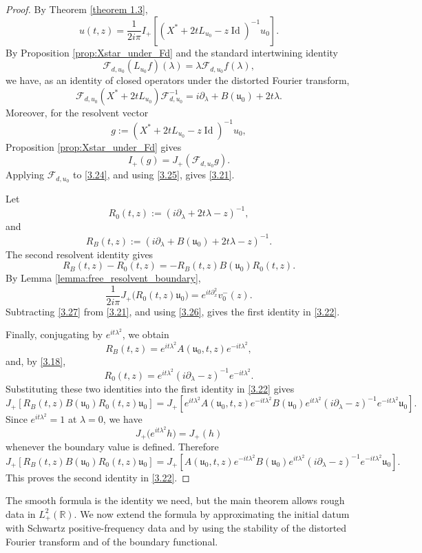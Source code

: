 \documentclass[10pt]{article}
\numberwithin{equation}{section}
\numberwithin{theorem}{section}
\begin{document}
\begin{proof}
By Theorem \ref{theorem 1.3},
\begin{equation}
\label{3.24}
u(t,z)
=
\frac1{2i\pi}
I_+\left[
(X^*+2tL_{u_0}-z\operatorname{Id})^{-1}u_0
\right].
\end{equation}
By Proposition \ref{prop:Xstar_under_Fd} and the standard intertwining identity
\[
\mathcal F_{d,u_0}(L_{u_0}f)(\lambda)
=
\lambda\mathcal F_{d,u_0}f(\lambda),
\]
we have, as an identity of closed operators under the distorted Fourier transform,
\begin{equation}
\label{3.25}
\mathcal F_{d,u_0}
(X^*+2tL_{u_0})
\mathcal F_{d,u_0}^{-1}
=
i\partial_\lambda+B(\mathfrak u_0)+2t\lambda .
\end{equation}
Moreover, for the resolvent vector
\[
g:=(X^*+2tL_{u_0}-z\operatorname{Id})^{-1}u_0,
\]
Proposition \ref{prop:Xstar_under_Fd} gives
\[
I_+(g)=J_+(\mathcal F_{d,u_0}g).
\]
Applying \(\mathcal F_{d,u_0}\) to \eqref{3.24}, and using \eqref{3.25}, gives
\eqref{3.21}.

Let
\[
R_0(t,z):=(i\partial_\lambda+2t\lambda-z)^{-1},
\]
and
\[
R_B(t,z):=(i\partial_\lambda+B(\mathfrak u_0)+2t\lambda-z)^{-1}.
\]
The second resolvent identity gives
\begin{equation}
\label{3.26}
R_B(t,z)-R_0(t,z)
=
-R_B(t,z)B(\mathfrak u_0)R_0(t,z).
\end{equation}
By Lemma \ref{lemma:free_resolvent_boundary},
\begin{equation}
\label{3.27}
\frac1{2i\pi}J_+\bigl(R_0(t,z)\mathfrak u_0\bigr)
=
e^{it\partial_x^2}v_0^-(z).
\end{equation}
Subtracting \eqref{3.27} from \eqref{3.21}, and using \eqref{3.26}, gives the first
identity in \eqref{3.22}.

Finally, conjugating by \(e^{it\lambda^2}\), we obtain
\[
R_B(t,z)
=
e^{it\lambda^2}
A(\mathfrak u_0,t,z)
e^{-it\lambda^2},
\]
and, by \eqref{3.18},
\[
R_0(t,z)
=
e^{it\lambda^2}
(i\partial_\lambda-z)^{-1}
e^{-it\lambda^2}.
\]
Substituting these two identities into the first identity in \eqref{3.22} gives
\[
J_+\left[
R_B(t,z)B(\mathfrak u_0)R_0(t,z)\mathfrak u_0
\right] =
J_+\left[
e^{it\lambda^2}
A(\mathfrak u_0,t,z)
e^{-it\lambda^2}
B(\mathfrak u_0)
e^{it\lambda^2}
(i\partial_\lambda-z)^{-1}
e^{-it\lambda^2}\mathfrak u_0
\right].
\]
Since \(e^{it\lambda^2}=1\) at \(\lambda=0\), we have
\[
J_+\bigl(e^{it\lambda^2}h\bigr)=J_+(h)
\]
whenever the boundary value is defined. Therefore
\[
J_+\left[
R_B(t,z)B(\mathfrak u_0)R_0(t,z)\mathfrak u_0
\right]  =
J_+\left[
A(\mathfrak u_0,t,z)
e^{-it\lambda^2}
B(\mathfrak u_0)
e^{it\lambda^2}
(i\partial_\lambda-z)^{-1}
e^{-it\lambda^2}\mathfrak u_0
\right].
\]
This proves the second identity in \eqref{3.22}.
\end{proof}
The smooth formula is the identity we need, but the main theorem allows rough data in
\(L_{+}^{2}(\mathbb R)\). We now extend the formula by approximating the initial datum with
Schwartz positive-frequency data and by using the stability of the distorted Fourier
transform and of the boundary functional.
\end{document}
